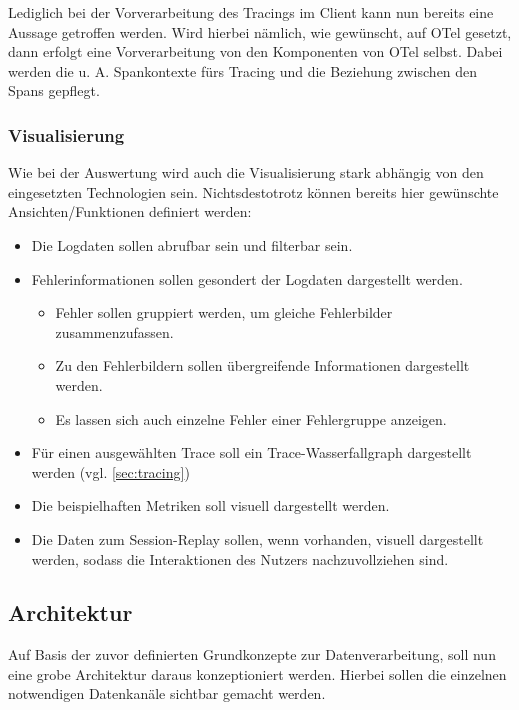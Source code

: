 		Lediglich bei der Vorverarbeitung des Tracings im Client kann nun bereits eine Aussage getroffen werden. Wird hierbei nämlich, wie gewünscht, auf OTel gesetzt, dann erfolgt eine Vorverarbeitung von den Komponenten von OTel selbst. Dabei werden die u. A. Spankontexte fürs Tracing und die Beziehung zwischen den Spans gepflegt.
		
		\subsubsection{Visualisierung}
		
		Wie bei der Auswertung wird auch die Visualisierung stark abhängig von den eingesetzten Technologien sein. Nichtsdestotrotz können bereits hier gewünschte Ansichten/Funktionen definiert werden:
		
		\begin{itemize}
			\item Die Logdaten sollen abrufbar sein und filterbar sein.
			\item Fehlerinformationen sollen gesondert der Logdaten dargestellt werden.
			\begin{itemize}
				\item Fehler sollen gruppiert werden, um gleiche Fehlerbilder zusammenzufassen.
				\item Zu den Fehlerbildern sollen übergreifende Informationen dargestellt werden.
				\item Es lassen sich auch einzelne Fehler einer Fehlergruppe anzeigen.
			\end{itemize}
			\item Für einen ausgewählten Trace soll ein Trace-Wasserfallgraph dargestellt werden (vgl. \autoref{sec:tracing})
			\item Die beispielhaften Metriken soll visuell dargestellt werden.
			\item Die Daten zum Session-Replay sollen, wenn vorhanden, visuell dargestellt werden, sodass die Interaktionen des Nutzers nachzuvollziehen sind.
		\end{itemize}
	
	\subsection{Architektur}

	Auf Basis der zuvor definierten Grundkonzepte zur Datenverarbeitung, soll nun eine grobe Architektur daraus konzeptioniert werden. Hierbei sollen die einzelnen notwendigen Datenkanäle sichtbar gemacht werden.

